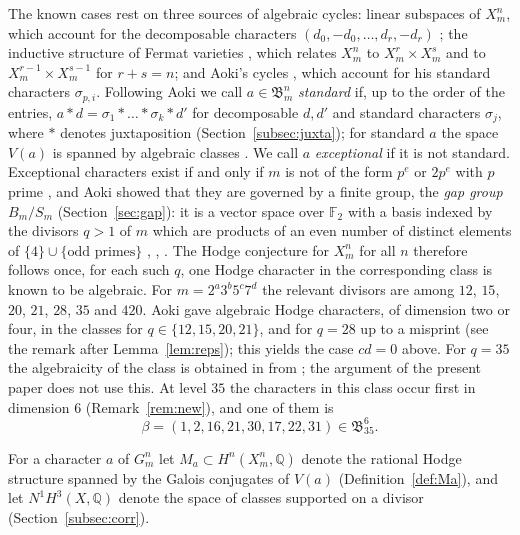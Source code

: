 \documentclass[11pt]{amsart}
\theoremstyle{definition}
\theoremstyle{remark}
\numberwithin{equation}{section}
\newcommand{\Q}{\mathbb{Q}}
\newcommand{\F}{\mathbb{F}}
\newcommand{\fB}{\mathfrak{B}}
\begin{document}
The known cases rest on three sources of algebraic cycles: linear subspaces of $X^n_m$, which account for the decomposable characters $(d_0,-d_0,\dots,d_r,-d_r)$ \cite{Ra80,Sh79}; the inductive structure of Fermat varieties \cite{SK79,Sh79}, which relates $X^n_m$ to $X^r_m\times X^s_m$ and to $X^{r-1}_m\times X^{s-1}_m$ for $r+s=n$; and Aoki's cycles \cite{Ao87}, which account for his standard characters $\sigma_{p,i}$. Following Aoki \cite{Ao83,Ao87,Ao00} we call $a\in\fB^n_m$ \emph{standard} if, up to the order of the entries, $a*d=\sigma_1*\dots*\sigma_k*d'$ for decomposable $d,d'$ and standard characters $\sigma_j$, where $*$ denotes juxtaposition (Section~\ref{subsec:juxta}); for standard $a$ the space $V(a)$ is spanned by algebraic classes \cite[Lemma~4.1]{Ao00}. We call $a$ \emph{exceptional} if it is not standard. Exceptional characters exist if and only if $m$ is not of the form $p^e$ or $2p^e$ with $p$ prime \cite[Cor.~2.2]{Ao00}, and Aoki showed that they are governed by a finite group, the \emph{gap group} $B_m/S_m$ (Section~\ref{sec:gap}): it is a vector space over $\F_2$ with a basis indexed by the divisors $q>1$ of $m$ which are products of an even number of distinct elements of $\{4\}\cup\{\text{odd primes}\}$ \cite[Thm.~D]{Ao83}, \cite[Thm.~2.1, Rem.~2.4]{Ao00}, \cite{Ya75}. The Hodge conjecture for $X^n_m$ for all $n$ therefore follows once, for each such $q$, one Hodge character in the corresponding class is known to be algebraic. For $m=2^a3^b5^c7^d$ the relevant divisors are among $12$, $15$, $20$, $21$, $28$, $35$ and $420$. Aoki gave algebraic Hodge characters, of dimension two or four, in the classes for $q\in\{12,15,20,21\}$, and for $q=28$ up to a misprint (see the remark after Lemma~\ref{lem:reps}); this yields the case $cd=0$ above. For $q=35$ the algebraicity of the class is obtained in \cite[Prop.~4.3, Table~4]{MMMV26} from \cite[Cor.~3.2]{Ka16}; the argument of the present paper does not use this. At level $35$ the characters in this class occur first in dimension $6$ (Remark~\ref{rem:new}), and one of them is
\[
\beta=(1,2,16,21,30,17,22,31)\in\fB^6_{35}.
\]

For a character $a$ of $G^n_m$ let $M_a\subset H^n(X^n_m,\Q)$ denote the rational Hodge structure spanned by the Galois conjugates of $V(a)$ (Definition~\ref{def:Ma}), and let $N^1H^3(X,\Q)$ denote the space of classes supported on a divisor (Section~\ref{subsec:corr}).
\end{document}
